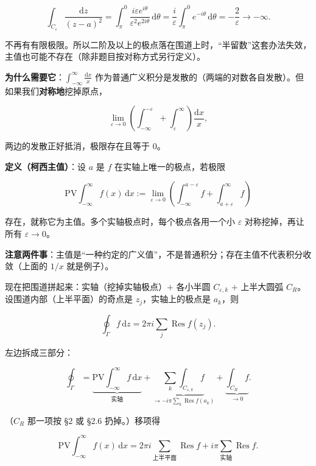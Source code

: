 \documentclass[11pt]{ctexart}
\let\origsubhdr\subhdr
\renewcommand{\subhdr}[1]{\par\needspace{4\baselineskip}\origsubhdr{#1}}
\let\orighdr\hdr
\renewcommand{\hdr}[2]{\par\orighdr{#1}{#2}}
\begin{document}
$$
\int_{C_\varepsilon}\frac{\mathrm{d}z}{(z-a)^{2}}
=\int_{\pi}^{0}\frac{i\varepsilon e^{i\theta}}{\varepsilon^{2}e^{2i\theta}}\,\mathrm{d}\theta
=\frac{i}{\varepsilon}\int_{\pi}^{0}e^{-i\theta}\,\mathrm{d}\theta
=-\frac{2}{\varepsilon}\to-\infty .
$$

不再有有限极限。所以二阶及以上的极点落在围道上时，“半留数”这套办法失效，主值也可能不存在（除非题目按对称方式另行定义）。



\textbf{为什么需要它}：$\displaystyle\int_{-\infty}^{\infty}\frac{\mathrm{d}x}{x}$ 作为普通广义积分是发散的（两端的对数各自发散）。但如果我们\textbf{对称地}挖掉原点，

$$
\lim_{\varepsilon\to0}\left(\int_{-\infty}^{-\varepsilon}+\int_{\varepsilon}^{\infty}\right)\frac{\mathrm{d}x}{x},
$$

两边的发散正好抵消，极限存在且等于 0。

\textbf{定义（柯西主值）}：设 $a$ 是 $f$ 在实轴上唯一的极点，若极限

$$
\mathrm{PV}\!\int_{-\infty}^{\infty}f(x)\,\mathrm{d}x
:=\lim_{\varepsilon\to0}\left(\int_{-\infty}^{a-\varepsilon}f+\int_{a+\varepsilon}^{\infty}f\right)
$$

存在，就称它为主值。多个实轴极点时，每个极点各用一个小 $\varepsilon$ 对称挖掉，再让所有 $\varepsilon\to0$。

\textbf{注意两件事}：主值是“一种约定的广义值”，不是普通积分；存在主值不代表积分收敛（上面的 $1/x$ 就是例子）。


现在把围道拼起来：实轴（挖掉实轴极点）$+$ 各小半圆 $C_{\varepsilon,k}$ $+$ 上半大圆弧 $C_R$。设围道内部（上半平面）的奇点是 $z_j$，实轴上的极点是 $a_k$，则

$$
\oint_\Gamma f\,\mathrm{d}z
=2\pi i\sum_j\operatorname{Res}f(z_j).
$$

左边拆成三部分：

$$
\oint_\Gamma=\underbrace{\mathrm{PV}\!\int_{-\infty}^{\infty}f\,\mathrm{d}x}_{\text{实轴}}
+\underbrace{\sum_k\int_{C_{\varepsilon,k}}f}_{\to -i\pi\sum_k\operatorname{Res}f(a_k)}
+\underbrace{\int_{C_R}f}_{\to0}.
$$

（$C_R$ 那一项按 §2 或 §2.6 扔掉。）移项得

$$
\mathrm{PV}\!\int_{-\infty}^{\infty}f(x)\,\mathrm{d}x
=2\pi i\sum_{\text{上半平面}}\operatorname{Res}f
+i\pi\sum_{\text{实轴}}\operatorname{Res}f .
$$
\end{document}

